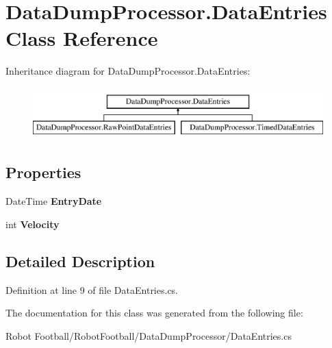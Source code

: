 \hypertarget{class_data_dump_processor_1_1_data_entries}{\section{Data\-Dump\-Processor.\-Data\-Entries Class Reference}
\label{class_data_dump_processor_1_1_data_entries}
}
Inheritance diagram for Data\-Dump\-Processor.\-Data\-Entries\-:\begin{figure}[H]
\begin{center}
\leavevmode
\includegraphics[height=2.000000cm]{class_data_dump_processor_1_1_data_entries}
\end{center}
\end{figure}
\subsection*{Properties}
\begin{DoxyCompactItemize}
\item 
\hypertarget{class_data_dump_processor_1_1_data_entries_a44d947a11ad3170493b80f40713a713b}{Date\-Time {\bfseries Entry\-Date}}\label{class_data_dump_processor_1_1_data_entries_a44d947a11ad3170493b80f40713a713b}

\item 
\hypertarget{class_data_dump_processor_1_1_data_entries_ab8702b9140bea9234972a892b1bf77bd}{int {\bfseries Velocity}}\label{class_data_dump_processor_1_1_data_entries_ab8702b9140bea9234972a892b1bf77bd}

\end{DoxyCompactItemize}


\subsection{Detailed Description}


Definition at line 9 of file Data\-Entries.\-cs.



The documentation for this class was generated from the following file\-:\begin{DoxyCompactItemize}
\item 
Robot Football/\-Robot\-Football/\-Data\-Dump\-Processor/Data\-Entries.\-cs\end{DoxyCompactItemize}
